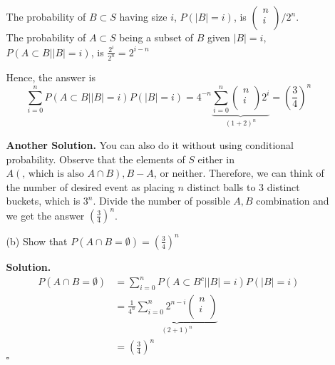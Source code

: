 \documentclass[12pt]{article}
\begin{document}
\begin{enumerate}
\begin{itemize}
    The probability of \(B \subset S\) having size \(i\),   \(P(|B| = i )\),  is \(\begin{pmatrix}
         n \\
          i\\
    \end{pmatrix} / 2^n\). \\
    
    The probability of \(A \subset S\) being a subset of \(B\) given \(|B| = i\), \(P(A \subset B | |B| = i)\), is \(\frac{2^i}{2^n} = 2^{i-n}\)
    
    Hence, the answer is 
    \[
        \sum_{i=0}^{n} P(A \subset B | |B| = i) P(|B| = i) = 4^{-n} \underbrace{\sum_{i=0}^{n}\begin{pmatrix}
             n \\
             i \\
        \end{pmatrix}2^i}_{(1+2)^n} = (\frac{3}{4})^n 
    \]
    
    \textbf{Another Solution.}
    You can also do it without using conditional probability. Observe that the elements of \(S\) either in \(A (\text{, which is also } A \cap B), B-A \), or neither.   
    Therefore, we can think of the number of desired event as placing \(n\) distinct balls to 3 distinct buckets, which is \(3^n\). 
    Divide the number of possible \(A, B\) combination and we get the answer \((\frac{3}{4})^n\).    
    \item[(b)] Show that $P(A \cap B  = \emptyset) = (\frac{3}{4})^n$
    
    \textbf{Solution.} 
    \begin{equation*}
        \begin{aligned}
            P(A\cap B = \emptyset)  &= \sum_{i=0}^{n} P(A \subset B^c| |B| = i ) P(|B| = i ) \\
             &= \frac{1}{4^n} \underbrace{\sum_{i=0}^{n} 2^{n-i}\begin{pmatrix}
                 n \\
                 i \\
             \end{pmatrix}}_{(2+1)^n} \\
             &= (\frac{3}{4})^n
        \end{aligned}
    \end{equation*}
\hspace{\linewidth}\(\square  \) 
\end{itemize}


\end{enumerate}
\end{document}
